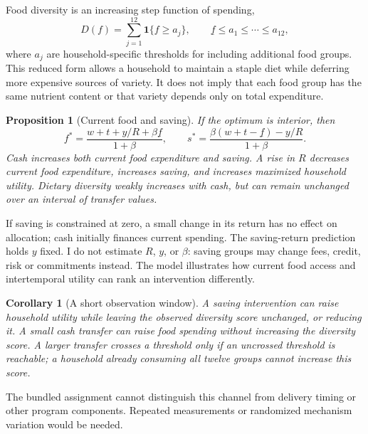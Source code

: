 \documentclass[11pt]{article}
\newtheorem{proposition}{Proposition}
\newtheorem{corollary}{Corollary}
\newcommand{\ind}{\mathbf{1}}
\begin{document}
Food diversity is an increasing step function of spending,
\begin{equation}
 D(f)=\sum_{j=1}^{12}\ind\{f\geq a_j\}, \qquad
 \underline f\leq a_1\leq\cdots\leq a_{12}, \label{eq:diet}
\end{equation}
where $a_j$ are household-specific thresholds for including additional food groups. This reduced form allows a household to maintain a staple diet while deferring more expensive sources of variety. It does not imply that each food group has the same nutrient content or that variety depends only on total expenditure.

\begin{proposition}[Current food and saving]\label{prop:saving}
If the optimum is interior, then
\[
 f^*=\frac{w+t+y/R+\beta\underline f}{1+\beta},\qquad
 s^*=\frac{\beta(w+t-\underline f)-y/R}{1+\beta}.
\]
Cash increases both current food expenditure and saving. A rise in $R$ decreases current food expenditure, increases saving, and increases maximized household utility. Dietary diversity weakly increases with cash, but can remain unchanged over an interval of transfer values.
\end{proposition}

If saving is constrained at zero, a small change in its return has no effect on allocation; cash initially finances current spending. The saving-return prediction holds $y$ fixed. I do not estimate $R$, $y$, or $\beta$: saving groups may change fees, credit, risk or commitments instead. The model illustrates how current food access and intertemporal utility can rank an intervention differently.

\begin{corollary}[A short observation window]
A saving intervention can raise household utility while leaving the observed diversity score unchanged, or reducing it. A small cash transfer can raise food spending without increasing the diversity score. A larger transfer crosses a threshold only if an uncrossed threshold is reachable; a household already consuming all twelve groups cannot increase this score.
\end{corollary}

The bundled assignment cannot distinguish this channel from delivery timing or other program components. Repeated measurements or randomized mechanism variation would be needed.
\end{document}
